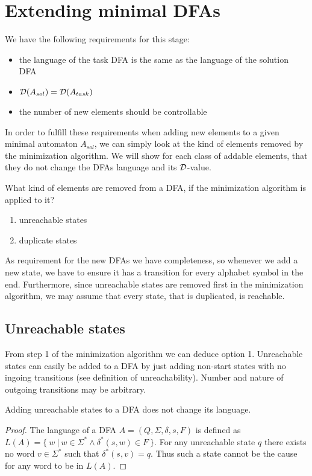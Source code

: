 
\chapter{Extending minimal DFAs}

We have the following requirements for this stage:
\begin{itemize}
	\item the language of the task DFA is the same as the language of the solution DFA
	\item $\mathcal{D}(A_{sol}) = \mathcal{D}(A_{task})$
	\item the number of new elements should be controllable
\end{itemize}
In order to fulfill these requirements when adding new elements to a given minimal automaton $A_{sol}$, we can simply look at the kind of elements removed by the minimization algorithm. We will show for each class of addable elements, that they do not change the DFAs language and its $\mathcal{D}$-value.

What kind of elements are removed from a DFA, if the minimization algorithm is applied to it?
\begin{enumerate}
	\item unreachable states
	\item duplicate states
\end{enumerate}
As requirement for the new DFAs we have completeness, so whenever we add a new state, we have to ensure it has a transition for every alphabet symbol in the end. Furthermore, since unreachable states are removed first in the minimization algorithm, we may assume that every state, that is duplicated, is reachable.

\section{Unreachable states}

From step 1 of the minimization algorithm we can deduce option 1. Unreachable states can easily be added to a DFA by just adding non-start states with no ingoing transitions (see definition of unreachability). Number and nature of outgoing transitions may be arbitrary.

\begin{lemma}
	Adding unreachable states to a DFA does not change its language.
\end{lemma}
\begin{proof}
	The language of a DFA $A = (Q, \Sigma, \delta, s, F)$ is defined as $L(A) = \{\ w\ |\ w \in \Sigma^* \land \delta^*(s, w) \in F\ \}$. For any unreachable state $q$ there exists no word $v \in \Sigma^*$ such that $\delta^*(s,v) = q$. Thus such a state cannot be the cause for any word to be in $L(A)$.
\end{proof}

